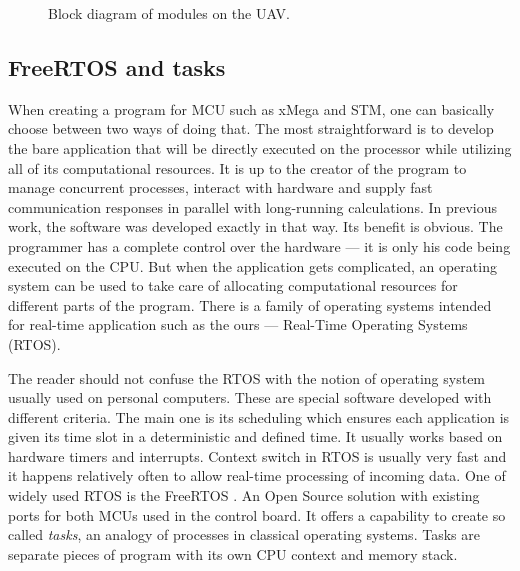 \begin{figure}[h]
\caption{Block diagram of modules on the UAV.}
\label{fig:block_diagram_uav}
\end{figure}

\subsection{FreeRTOS and tasks}

When creating a program for MCU such as xMega and STM, one can basically choose between two ways of doing that. The most straightforward is to develop the bare application that will be directly executed on the processor while utilizing all of its computational resources. It is up to the creator of the program to manage concurrent processes, interact with hardware and supply fast communication responses in parallel with long-running calculations. In previous work, the software was developed exactly in that way. Its benefit is obvious. The programmer has a complete control over the hardware --- it is only his code being executed on the CPU. But when the application gets complicated, an operating system can be used to take care of allocating computational resources for different parts of the program. There is a family of operating systems intended for real-time application such as the ours --- Real-Time Operating Systems (RTOS). 

The reader should not confuse the RTOS with the notion of operating system usually used on personal computers. These are special software developed with different criteria. The main one is its scheduling which ensures each application is given its time slot in a deterministic and defined time. It usually works based on hardware timers and interrupts. Context switch in RTOS is usually very fast and it happens relatively often to allow real-time processing of incoming data. One of widely used RTOS is the FreeRTOS \citep{freertos}. An Open Source solution with existing ports for both MCUs used in the control board. It offers a capability to create so called \textit{tasks}, an analogy of processes in classical operating systems. Tasks are separate pieces of program with its own CPU context and memory stack. 

